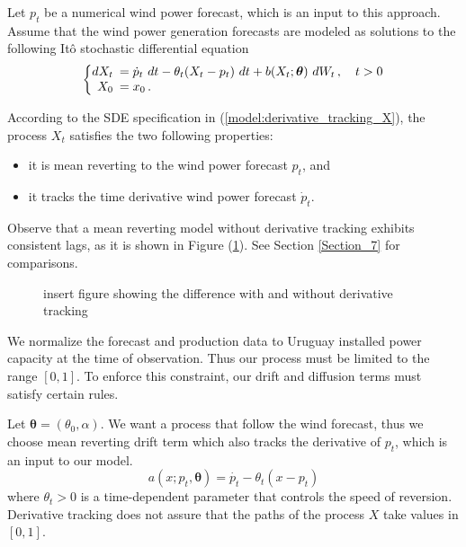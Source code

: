 \documentclass[11pt]{article}
\theoremstyle{definition}
\begin{document}
Let $p_t$ be a numerical wind power forecast, which is an input to this approach. Assume that the wind power generation forecasts are modeled as solutions to the following It\^{o} stochastic differential equation
\begin{equation}
  \left\{
  \begin{array}{@{}rl@{}}
    dX_t \!\!\!&= \dot{p}_t \ dt - \theta_t (X_t - p_t) \ dt + b (X_t; \bm{\theta} ) \ dW_t\,, \quad t > 0  \\
   X_0  \!\!\!&=  x_0 \,.
 \end{array}\right.  \label{model:derivative_tracking_X}
\end{equation} 

According to the SDE specification in (\ref{model:derivative_tracking_X}), the process $X_t$ satisfies the two following properties: \begin{itemize}
\item it is mean reverting to the wind power forecast $p_t$, and 
\item it tracks the time derivative wind power forecast $\dot{p}_t$.  
\end{itemize} 
Observe that a mean reverting model without derivative tracking exhibits consistent lags, as it is shown in Figure (\ref{fig:derivative_tracking}). See Section \ref{Section_7} for comparisons.

\begin{figure}
  \caption{insert figure showing the difference with and without derivative tracking}
  \label{fig:derivative_tracking}
\end{figure}


We normalize the forecast and production data to Uruguay installed power capacity at the time of observation. Thus our process must be limited to the range $[0,1]$. To enforce this constraint, our  drift and diffusion terms  must satisfy certain rules.
 

Let $\bm{\theta} = (\theta_0,\alpha)$. We want a process that follow the wind forecast, thus we choose mean reverting drift term which also tracks the derivative of $p_t$, which is an input to our model.
  \begin{equation}
    a(x; p_t,\bm{\theta})=  \dot{p_t} - \theta_t(x - p_t)
  \end{equation}
where $\theta_t>0$ is a time-dependent parameter that controls the speed of reversion. {\color{red} Derivative tracking does not assure that the paths of the process $X$ take values in $[0,1]$.}
\end{document}
